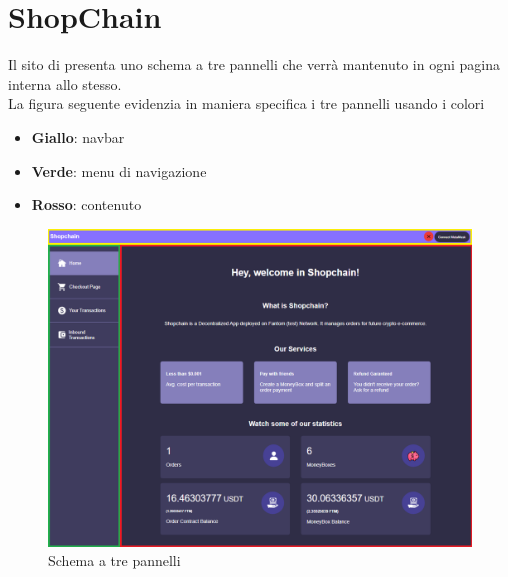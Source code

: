 \section{ShopChain}
Il sito di \projectName{} presenta uno schema a tre pannelli che verrà mantenuto in ogni pagina interna allo stesso.\\
La figura seguente evidenzia in maniera specifica i tre pannelli usando i colori
\begin{itemize}
    \item \textbf{Giallo}: navbar
    \item \textbf{Verde}: menu di navigazione
    \item \textbf{Rosso}: contenuto
\end{itemize}
\begin{figure}[H]
    \centering
    \includegraphics[scale=0.5]{immagini/trePannelli.png}
    \caption{Schema a tre pannelli}
\end{figure}


